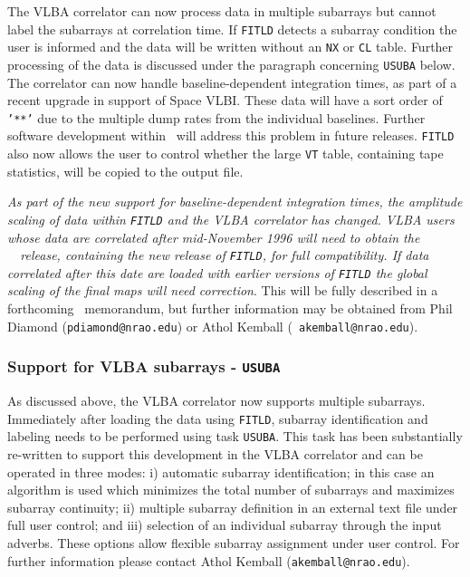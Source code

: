 The VLBA correlator can now process data in multiple subarrays but
cannot label the subarrays at correlation time. If {\tt FITLD} detects
a subarray condition the user is informed and the data will be written
without an {\tt NX} or {\tt CL} table. Further processing of the data
is discussed under the paragraph concerning {\tt USUBA} below. The
correlator can now handle baseline-dependent integration times, as
part of a recent upgrade in support of Space VLBI. These data will
have a sort order of {\tt '**'} due to the multiple dump rates from
the individual baselines. Further software development within \AIPS\
will address this problem in future releases. {\tt FITLD} also now
allows the user to control whether the large {\tt VT} table,
containing tape statistics, will be copied to the output file.

{\it As part of the new support for baseline-dependent integration
times, the amplitude scaling of data within {\tt FITLD} and the VLBA
correlator has changed. VLBA users whose data are correlated after
mid-November 1996 will need to obtain the \RELEASENAME\ \AIPS\
release, containing the new release of {\tt FITLD}, for full
compatibility. If data correlated after this date are loaded with
earlier versions of {\tt FITLD} the global scaling of the final maps
will need correction}. This will be fully described in a forthcoming
\AIPS\ memorandum, but further information may be obtained from Phil
Diamond ({\tt pdiamond@nrao.edu}) or Athol Kemball ({\tt
akemball@nrao.edu}).

\subsubsection{Support for VLBA subarrays - {\tt USUBA}}

As discussed above, the VLBA correlator now supports multiple
subarrays. Immediately after loading the data using {\tt FITLD},
subarray identification and labeling needs to be performed using task
{\tt USUBA}. This task has been substantially re-written to support
this development in the VLBA correlator and can be operated in three
modes: i) automatic subarray identification; in this case an algorithm
is used which minimizes the total number of subarrays and maximizes
subarray continuity; ii) multiple subarray definition in an external
text file under full user control; and iii) selection of an individual
subarray through the input adverbs. These options allow flexible
subarray assignment under user control. For further information please
contact Athol Kemball ({\tt akemball@nrao.edu}).

